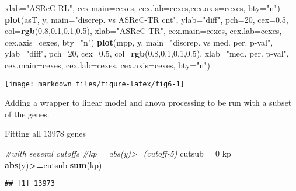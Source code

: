 \documentclass[]{article}
\newenvironment{Shaded}{\begin{snugshade}}{\end{snugshade}}
\newcommand{\KeywordTok}[1]{\textcolor[rgb]{0.13,0.29,0.53}{\textbf{#1}}}
\newcommand{\DataTypeTok}[1]{\textcolor[rgb]{0.13,0.29,0.53}{#1}}
\newcommand{\DecValTok}[1]{\textcolor[rgb]{0.00,0.00,0.81}{#1}}
\newcommand{\FloatTok}[1]{\textcolor[rgb]{0.00,0.00,0.81}{#1}}
\newcommand{\StringTok}[1]{\textcolor[rgb]{0.31,0.60,0.02}{#1}}
\newcommand{\CommentTok}[1]{\textcolor[rgb]{0.56,0.35,0.01}{\textit{#1}}}
\newcommand{\OperatorTok}[1]{\textcolor[rgb]{0.81,0.36,0.00}{\textbf{#1}}}
\newcommand{\NormalTok}[1]{#1}
\begin{document}
\begin{Shaded}
\begin{Highlighting}[]
     \DataTypeTok{xlab=}\StringTok{"ASReC-RL"}\NormalTok{, }\DataTypeTok{cex.main=}\NormalTok{cexes, }\DataTypeTok{cex.lab=}\NormalTok{cexes,}\DataTypeTok{cex.axis=}\NormalTok{cexes, }\DataTypeTok{bty=}\StringTok{"n"}\NormalTok{)}
\KeywordTok{plot}\NormalTok{(asT, y, }\DataTypeTok{main=}\StringTok{"discrep. vs ASReC-TR cnt"}\NormalTok{, }\DataTypeTok{ylab=}\StringTok{"diff"}\NormalTok{,  }\DataTypeTok{pch=}\DecValTok{20}\NormalTok{, }\DataTypeTok{cex=}\FloatTok{0.5}\NormalTok{, }\DataTypeTok{col=}\KeywordTok{rgb}\NormalTok{(}\FloatTok{0.8}\NormalTok{,}\FloatTok{0.1}\NormalTok{,}\FloatTok{0.1}\NormalTok{,}\FloatTok{0.5}\NormalTok{),}
     \DataTypeTok{xlab=}\StringTok{"ASReC-TR"}\NormalTok{, }\DataTypeTok{cex.main=}\NormalTok{cexes, }\DataTypeTok{cex.lab=}\NormalTok{cexes, }\DataTypeTok{cex.axis=}\NormalTok{cexes, }\DataTypeTok{bty=}\StringTok{"n"}\NormalTok{)}
\KeywordTok{plot}\NormalTok{(mpp, y, }\DataTypeTok{main=}\StringTok{"discrep. vs med. per. p-val"}\NormalTok{, }\DataTypeTok{ylab=}\StringTok{"diff"}\NormalTok{,  }\DataTypeTok{pch=}\DecValTok{20}\NormalTok{, }\DataTypeTok{cex=}\FloatTok{0.5}\NormalTok{, }\DataTypeTok{col=}\KeywordTok{rgb}\NormalTok{(}\FloatTok{0.8}\NormalTok{,}\FloatTok{0.1}\NormalTok{,}\FloatTok{0.1}\NormalTok{,}\FloatTok{0.5}\NormalTok{), }
     \DataTypeTok{xlab=}\StringTok{"med. per. p-val"}\NormalTok{, }\DataTypeTok{cex.main=}\NormalTok{cexes, }\DataTypeTok{cex.lab=}\NormalTok{cexes, }\DataTypeTok{cex.axis=}\NormalTok{cexes, }\DataTypeTok{bty=}\StringTok{"n"}\NormalTok{)}
\end{Highlighting}
\end{Shaded}

\begin{center}\texttt{[image: markdown\_files/figure-latex/fig6-1]} \end{center}

Adding a wrapper to linear model and anova processing to be run with a
subset of the genes.

Fitting all 13978 genes

\begin{Shaded}
\begin{Highlighting}[]
\CommentTok{#with several cutoffs}
\CommentTok{#kp = abs(y)>=(cutoff-5)}
\NormalTok{cutsub =}\StringTok{ }\DecValTok{0}
\NormalTok{kp =}\StringTok{ }\KeywordTok{abs}\NormalTok{(y)}\OperatorTok{>=}\NormalTok{cutsub}
\KeywordTok{sum}\NormalTok{(kp)}
\end{Highlighting}
\end{Shaded}

\begin{verbatim}
## [1] 13973
\end{verbatim}
\end{document}
